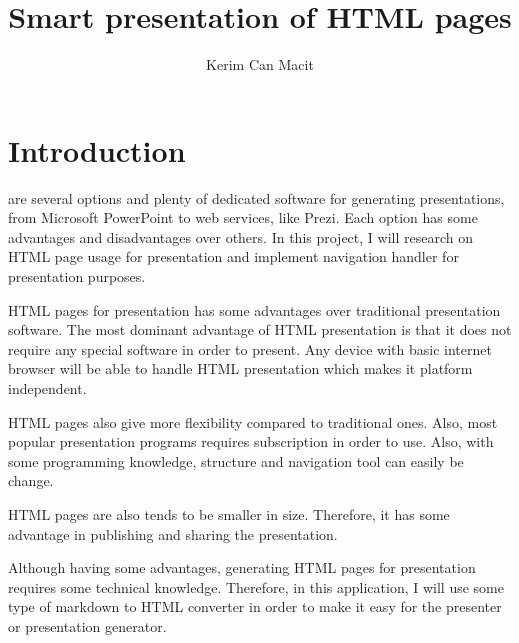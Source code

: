 \documentclass[journal,comsoc]{IEEEtran}
\begin{document}
\title{
	Smart presentation of HTML pages
}

\author{Kerim Can Macit}


\maketitle






\IEEEpeerreviewmaketitle


\section{Introduction}

are several options and plenty of dedicated software for generating presentations, from Microsoft PowerPoint to web services, like Prezi. Each option has some advantages and disadvantages over others. In this project, I will research on HTML page usage for presentation and implement navigation handler for presentation purposes.

HTML pages for presentation has some advantages over traditional presentation software. The most dominant advantage of HTML presentation is that it does not require any special software in order to present. Any device with basic internet browser will be able to handle HTML presentation which makes it platform independent. 

HTML pages also give more flexibility compared to traditional ones. Also, most popular presentation programs requires subscription in order to use. Also, with some programming knowledge, structure and navigation tool can easily be change.

HTML pages are also tends to be smaller in size. Therefore, it has some advantage in publishing and sharing the presentation.

Although having some advantages, generating HTML pages for presentation requires some technical knowledge. Therefore, in this application, I will use some type of markdown to HTML converter in order to make it easy for the presenter or presentation generator.
\end{document}
